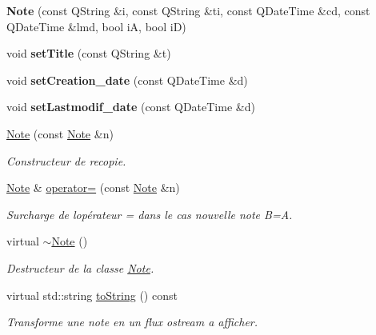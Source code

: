 \begin{DoxyCompactItemize}
\mbox{\label{class_note_a0c1c2ba85358585f266b0fdcbcb45a70}} 
{\bfseries Note} (const Q\+String \&i, const Q\+String \&ti, const Q\+Date\+Time \&cd, const Q\+Date\+Time \&lmd, bool iA, bool iD)
\item 
\mbox{\label{class_note_a7a9ca310664f058b56ccc33005688e25}} 
void {\bfseries set\+Title} (const Q\+String \&t)
\item 
\mbox{\label{class_note_ab83acc1404775a43af17a31edeaae246}} 
void {\bfseries set\+Creation\+\_\+date} (const Q\+Date\+Time \&d)
\item 
\mbox{\label{class_note_a2cb5616e643b49316bd95e9a2b958e44}} 
void {\bfseries set\+Lastmodif\+\_\+date} (const Q\+Date\+Time \&d)
\item 
\hyperlink{class_note_ac06fd282c05bbfe2e1675fe0677b2efb}{Note} (const \hyperlink{class_note}{Note} \&n)
\begin{DoxyCompactList}\small\item\em Constructeur de recopie. \end{DoxyCompactList}\item 
\mbox{\label{class_note_ac9b2b6b880bd4c01738ee43bde04b7e5}} 
\hyperlink{class_note}{Note} \& \hyperlink{class_note_ac9b2b6b880bd4c01738ee43bde04b7e5}{operator=} (const \hyperlink{class_note}{Note} \&n)
\begin{DoxyCompactList}\small\item\em Surcharge de l\textquotesingle{}opérateur = dans le cas nouvelle note B=A. \end{DoxyCompactList}\item 
\mbox{\label{class_note_ade484273015c82e7fa59a028de0d8818}} 
virtual \hyperlink{class_note_ade484273015c82e7fa59a028de0d8818}{$\sim$\+Note} ()
\begin{DoxyCompactList}\small\item\em Destructeur de la classe \hyperlink{class_note}{Note}. \end{DoxyCompactList}\item 
virtual std\+::string \hyperlink{class_note_a1bd4acfbde0b71d05fd7d4ca889bca2b}{to\+String} () const
\begin{DoxyCompactList}\small\item\em Transforme une note en un flux ostream a afficher. \end{DoxyCompactList}\item 

\end{DoxyCompactItemize}
